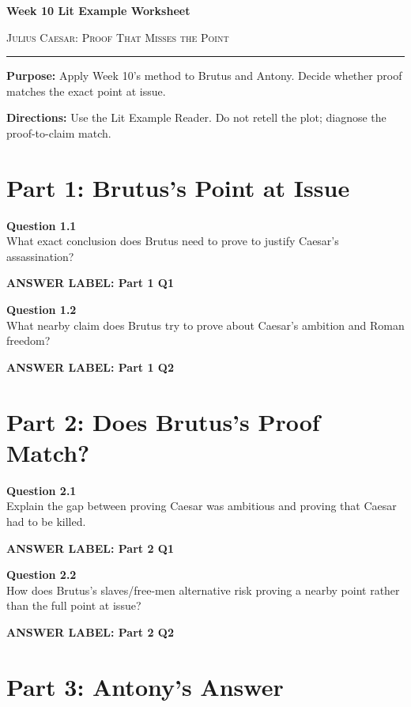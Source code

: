 \documentclass[12pt]{article}
\newcommand{\answerbox}[2]{%
\vspace{0.12em}
\noindent\textbf{#1}\par
\vspace{0.04em}
\noindent\fbox{%
\begin{minipage}[t][#2]{\dimexpr\textwidth-2\fboxsep-2\fboxrule}
\rule{\textwidth}{0pt}
\vspace{#2}
\end{minipage}}
\par\vspace{0.22em}}
\begin{document}
\begin{center}
{\LARGE\bfseries Week 10 Lit Example Worksheet}\par\vspace{0.05em}
{\large\scshape Julius Caesar: Proof That Misses the Point}\par\vspace{0.12em}
\rule{0.78\textwidth}{0.5pt}
\end{center}

\textbf{Purpose:} Apply Week 10's method to Brutus and Antony. Decide whether proof matches the exact point at issue.

\textbf{Directions:} Use the Lit Example Reader. Do not retell the plot; diagnose the proof-to-claim match.

\section*{Part 1: Brutus's Point at Issue}

\textbf{Question 1.1}\\[-0.15em]
What exact conclusion does Brutus need to prove to justify Caesar's assassination?

\answerbox{ANSWER LABEL: Part 1 Q1}{1.85in}

\textbf{Question 1.2}\\[-0.15em]
What nearby claim does Brutus try to prove about Caesar's ambition and Roman freedom?

\answerbox{ANSWER LABEL: Part 1 Q2}{2.05in}

\newpage

\section*{Part 2: Does Brutus's Proof Match?}

\textbf{Question 2.1}\\[-0.15em]
Explain the gap between proving Caesar was ambitious and proving that Caesar had to be killed.

\answerbox{ANSWER LABEL: Part 2 Q1}{2.35in}

\textbf{Question 2.2}\\[-0.15em]
How does Brutus's slaves/free-men alternative risk proving a nearby point rather than the full point at issue?

\answerbox{ANSWER LABEL: Part 2 Q2}{2.35in}

\newpage

\section*{Part 3: Antony's Answer}
\end{document}
